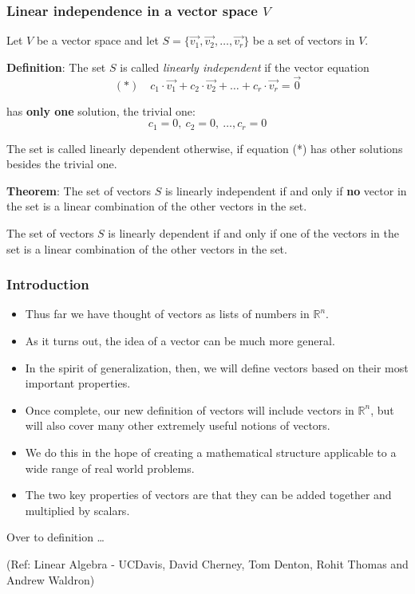 \begin{frame}[fragile]
\frametitle{Linear independence in a vector space $V$}

Let $V$ be a vector space and let $S = \{ \vec{v_1}, \vec{v_2}, \ldots, \vec{v_r} \}$ be a set of vectors in $V$.



\textbf{Definition}: The set  $S$ is called {\em linearly independent} if the vector equation
\begin{equation*}
(*) \quad  c_1 \cdot \vec{v_1} + c_2 \cdot \vec{v_2} + \ldots + c_r \cdot \vec{v_r} = \vec{0}
\end{equation*}


has \textbf{only one} solution, the trivial one:
$$c_1 = 0, \ c_2 = 0, \ \ldots, c_r = 0$$

The set is called linearly dependent otherwise, if equation (*) has other solutions besides the trivial one.

\textbf{Theorem}: The set of vectors $S$ is linearly independent if and only if \textbf{no} vector in the set is a linear combination of the other vectors in the set.

The set of vectors $S$ is linearly dependent if and only if one of the vectors in the set is a linear combination of the other vectors in the set.
\end{frame}




\begin{frame}[fragile]
\frametitle{Introduction}
\begin{itemize}
\item Thus far we have thought of vectors as lists of numbers in $\mathbb{R}^n$.  
\item As it turns out, the idea of a vector can be much more general.  
\item In the spirit of generalization, then, we will define vectors based on their most important properties.  
\item Once complete, our new definition of vectors will include vectors in $\mathbb{R}^n$, but will also cover many other extremely useful notions of vectors. 
\item We do this in the hope of creating a mathematical structure
applicable to a wide range of real world problems.
\item The two key properties of vectors are that they can be added together and multiplied by scalars.  
\end{itemize}

Over to definition \ldots

\tiny{(Ref: Linear Algebra - UCDavis, David Cherney, Tom Denton, Rohit Thomas and Andrew Waldron)}


\end{frame}

